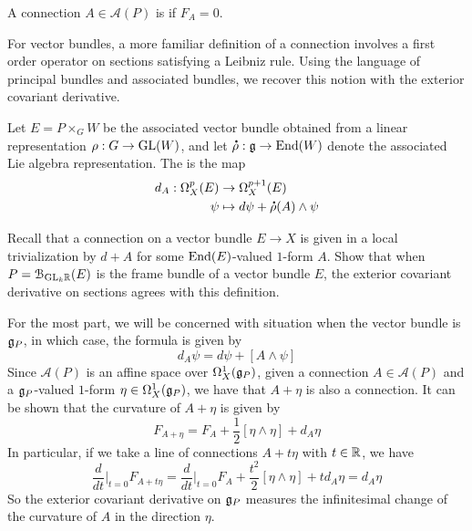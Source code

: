 %
\begin{defn}
A connection $A \in \mathscr{A}(P)$ is  if $F_A = 0$.
\end{defn}
%
For vector bundles, a more familiar definition of a connection involves
a first order operator on sections satisfying a Leibniz rule. Using
the language of principal bundles and associated bundles, we recover
this notion with the exterior covariant derivative.
%
\begin{defn}
Let $E = P\times_G W$ be the associated vector bundle obtained from a
linear representation $\rho : G \to \mathrm{GL}(W)$, and let $\accentset{\mbox{\large\bfseries .}}{\rho} : \mathfrak{g} \to \operatorname{End}(W)$
denote the associated Lie algebra representation. The 
is the map
\begin{align*}
d_A : \Omega^p_X(E) &\to \Omega^{p+1}_X(E) \\
\psi &\mapsto d\psi + \accentset{\mbox{\large\bfseries .}}{\rho}(A) \wedge \psi
\end{align*}
\end{defn}
%
\begin{exer}
Recall that a connection on a vector bundle $E \to X$ is given in a local
trivialization by $d + A$ for some $\operatorname{End}(E)$-valued $1$-form $A$.
Show that when $P = \mathcal{B}_{\mathrm{GL}_k\mathbb{R}}(E)$ is the frame bundle of a vector
bundle $E$, the exterior covariant derivative on sections agrees with
this definition.
\end{exer}
%
For the most part, we will be concerned with situation when the vector
bundle is $\mathfrak{g}_P$, in which case, the formula is given by
\[
d_A\psi = d\psi + [A\wedge\psi]
\]
Since $\mathscr{A}(P)$ is an affine space over $\Omega^1_X(\mathfrak{g}_P)$, given
a connection $A \in \mathscr{A}(P)$ and a $\mathfrak{g}_P$-valued $1$-form
$\eta \in \Omega^1_X(\mathfrak{g}_P)$, we have that $A + \eta$ is also a connection.
It can be shown that the curvature of $A+\eta$ is given by
\[
F_{A + \eta} = F_A + \frac{1}{2}[\eta\wedge\eta] + d_A\eta
\]
In particular, if we take a line of connections $A + t\eta$ with $t \in \mathbb{R}$,
we have
\[
\frac{d}{dt}\bigg\vert_{t=0}F_{A+t\eta}
= \frac{d}{dt}\bigg\vert_{t=0}F_A + \frac{t^2}{2}[\eta\wedge\eta] + td_A\eta
= d_A\eta
\]
So the exterior covariant derivative on $\mathfrak{g}_P$ measures the infinitesimal
change of the curvature of $A$ in the direction $\eta$.
%